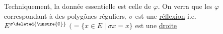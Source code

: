 
Techniquement, la donnée essentielle est celle de $\varphi$. On verra que   les $\varphi$  correspondant à des polygônes réguliers, \deleted{\unsure{\(\Rightarrow\)}} $\sigma$ est une \uline{réflexion} i.e. $E^{\sigma\deleted{\unsure{0}}}$ $(=\{x\in E\mid \sigma x=x\}$ est une \uline{droite}
